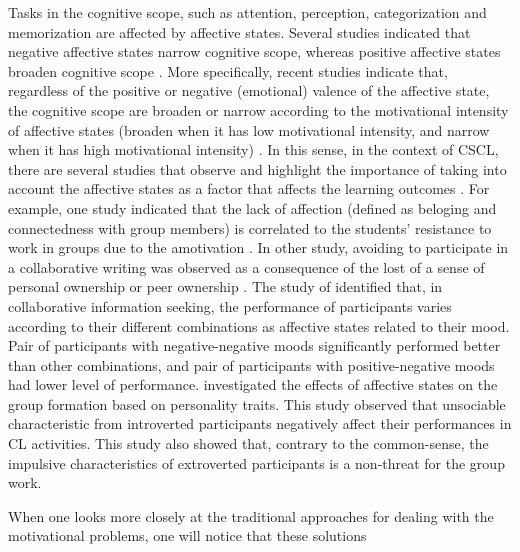
Tasks in the cognitive scope, such as attention, perception, categorization and memorization are affected by affective states.
Several studies indicated that negative affective states narrow cognitive scope, whereas positive affective states broaden cognitive scope \cite{HicksFriedmanGableDavis2012,GableHarmon-Jones2008,Fredrickson2001,KimchiPalmer1982,Navon1977,Easterbrook1959}.
More specifically, recent studies indicate that, regardless of the positive or negative (emotional) valence of the affective state, the cognitive scope are broaden or narrow according to the motivational intensity of affective states (broaden when it has low motivational intensity, and narrow when it has high motivational intensity) \cite{Harmon-JonesGablePrice2012,DomachowskaHeitmannDeutschGoschkeScherbaumBolte2016,Harmon-JonesGablePrice2013}.
In this sense, in the context of CSCL, there are several studies that observe and highlight the importance of taking into account the affective states as a factor that affects the learning outcomes \cite{DaradoumisArguedasXhafa2013, ZhouChen2014,ReisRodriguezLyraJaquesBittencourtIsotani2015,ReisIsotaniRodriguezLyraJaquesBittencourt2018}.
For example, one study indicated that the lack of affection (defined as beloging and connectedness with group members) is correlated to the students' resistance to work in groups due to the amotivation \cite{SoBrush2008}. 
In other study, avoiding to participate in a collaborative writing was observed as a consequence of the lost of a sense of personal ownership or peer ownership \cite{CaspiBlau2011}.
The study of  identified that, in collaborative information seeking, the performance of participants varies according to their different combinations as affective states related to their mood.
Pair of participants with negative-negative moods significantly performed better than other combinations, and pair of participants with positive-negative moods had lower level of performance.
 investigated the effects of affective states on the group formation based on personality traits.
This study observed that unsociable characteristic from introverted participants negatively affect their performances in CL activities.
This study also showed that, contrary to the common-sense, the impulsive characteristics of extroverted participants is a non-threat for the group work.





When one looks more closely at the traditional approaches for dealing with the motivational problems, one will notice that these solutions 

